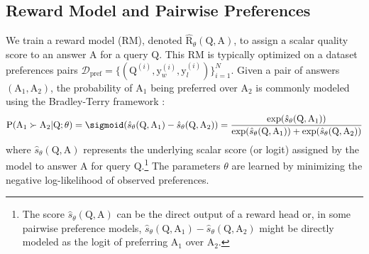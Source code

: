 \subsection{Reward Model and Pairwise Preferences}
We train a reward model (RM), denoted $\hat{\mathrm{R}}_\theta(\mathrm{Q}, \mathrm{A})$, to assign a scalar quality score to an answer $\mathrm{A}$ for a query $\mathrm{Q}$. This RM is typically optimized on a dataset  preferences pairs $\mathcal{D}_{\mathrm{pref}} = \{(\mathrm{Q}^{(i)}, \mathrm{y}_w^{(i)}, \mathrm{y}_l^{(i)})\}_{i=1}^N$. Given a pair of answers $(\mathrm{A}_1, \mathrm{A}_2)$, the probability of $\mathrm{A}_1$ being preferred over $\mathrm{A}_2$ is commonly modeled using the Bradley-Terry framework \citep{bradley1952rank}:
\begin{equation}
\mathrm{P}(\mathrm{A}_1 \succ \mathrm{A}_2 | \mathrm{Q}; \theta) = \sigmoid(\hat{s}_\theta(\mathrm{Q}, \mathrm{A}_1) - \hat{s}_\theta(\mathrm{Q}, \mathrm{A}_2)) = \frac{\exp(\hat{s}_\theta(\mathrm{Q}, \mathrm{A}_1))}{\exp(\hat{s}_\theta(\mathrm{Q}, \mathrm{A}_1)) + \exp(\hat{s}_\theta(\mathrm{Q}, \mathrm{A}_2))}
\label{eq:bt_prob_roman}
\end{equation}
where $\hat{s}_\theta(\mathrm{Q}, \mathrm{A})$ represents the underlying scalar score (or logit) assigned by the model to answer $\mathrm{A}$ for query $\mathrm{Q}$.\footnote{The score $\hat{s}_\theta(\mathrm{Q}, \mathrm{A})$ can be the direct output of a reward head or, in some pairwise preference models, $\hat{s}_\theta(\mathrm{Q}, \mathrm{A}_1) - \hat{s}_\theta(\mathrm{Q}, \mathrm{A}_2)$ might be directly modeled as the logit of preferring $\mathrm{A}_1$ over $\mathrm{A}_2$.} The parameters $\theta$ are learned by minimizing the negative log-likelihood of observed preferences.

